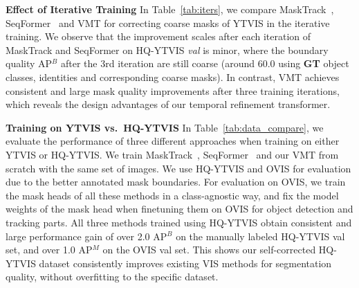 \documentclass[runningheads]{llncs}
\newcommand{\parsection}[1]{\textbf{#1} }
\begin{document}
\parsection{Effect of Iterative Training} 
In Table~\ref{tab:iters}, we compare MaskTrack~\cite{yang2019video}, SeqFormer~\cite{wu2021seqformer} and VMT for correcting coarse masks of YTVIS in the iterative training. We observe that the improvement scales after each iteration of MaskTrack and SeqFormer on HQ-YTVIS \textit{val} is minor, where the boundary quality AP$^B$ after the 3rd iteration are still coarse (around 60.0 using \textbf{GT} object classes, identities and corresponding coarse masks). In contrast, VMT achieves consistent and large mask quality improvements after three training iterations, which reveals the design advantages of our temporal refinement transformer.





\parsection{Training on YTVIS vs.\ HQ-YTVIS} In Table~\ref{tab:data_compare}, we evaluate the performance of three different approaches when training on either YTVIS or HQ-YTVIS. We train MaskTrack~\cite{yang2019video}, SeqFormer~\cite{wu2021seqformer} and our VMT from scratch with the same set of images.
We use HQ-YTVIS and OVIS for evaluation due to the better annotated mask boundaries. For evaluation on OVIS, we train the mask heads of all these methods in a class-agnostic way, and fix the model weights of the mask head when finetuning them on OVIS for object detection and tracking parts.
All three methods trained using HQ-YTVIS obtain consistent and large performance gain of over 2.0 AP$^B$ on the manually labeled HQ-YTVIS val set, and over 1.0 AP$^M$ on the OVIS val set. 
This shows our self-corrected HQ-YTVIS dataset consistently improves existing VIS methods for segmentation quality, without overfitting to the specific dataset. 
\end{document}
